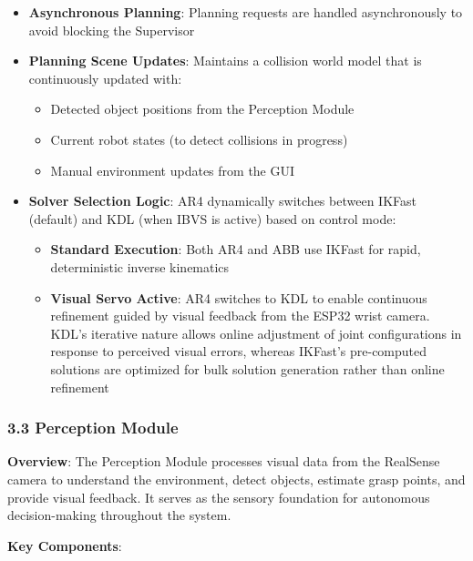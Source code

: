 \begin{itemize}
    \item \textbf{Asynchronous Planning}: Planning requests are handled asynchronously to avoid blocking the Supervisor
    \item \textbf{Planning Scene Updates}: Maintains a collision world model that is continuously updated with:
    \begin{itemize}
        \item Detected object positions from the Perception Module
        \item Current robot states (to detect collisions in progress)
        \item Manual environment updates from the GUI
    \end{itemize}
    \item \textbf{Solver Selection Logic}: AR4 dynamically switches between IKFast (default) and KDL (when IBVS is active) based on control mode:
    \begin{itemize}
        \item \textbf{Standard Execution}: Both AR4 and ABB use IKFast for rapid, deterministic inverse kinematics
        \item \textbf{Visual Servo Active}: AR4 switches to KDL to enable continuous refinement guided by visual feedback from the ESP32 wrist camera. KDL's iterative nature allows online adjustment of joint configurations in response to perceived visual errors, whereas IKFast's pre-computed solutions are optimized for bulk solution generation rather than online refinement
    \end{itemize}
\end{itemize}

\subsubsection{3.3 Perception Module}
\label{subsubsec:perception_module}

\textbf{Overview}: The Perception Module processes visual data from the RealSense camera to understand the environment, detect objects, estimate grasp points, and provide visual feedback. It serves as the sensory foundation for autonomous decision-making throughout the system.

\textbf{Key Components}:

